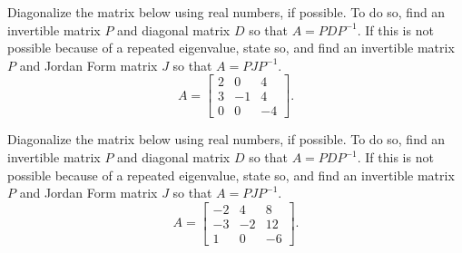 \begin{exercise}
Diagonalize the matrix below using real numbers, if possible. To do so, find an invertible matrix $P$ and diagonal matrix $D$ so that $A = PDP^{-1}$. If this is not possible because of a repeated eigenvalue, state so, and find an invertible matrix $P$ and Jordan Form matrix $J$ so that $A = PJP^{-1}$. 
\[ A = \begin{bmatrix} 2 &  0 &  4 \\ 3  &-1 & 4 \\ 0  & 0 &-4 \end{bmatrix}.\]
\end{exercise} 
%

\begin{exercise}
Diagonalize the matrix below using real numbers, if possible. To do so, find an invertible matrix $P$ and diagonal matrix $D$ so that $A = PDP^{-1}$. If this is not possible because of a repeated eigenvalue, state so, and find an invertible matrix $P$ and Jordan Form matrix $J$ so that $A = PJP^{-1}$. 
\[ A = \begin{bmatrix} -2 & 4 &8\\ -3 & -2& 12\\ 1 & 0 & -6 \end{bmatrix}.\]
\end{exercise} 
%

